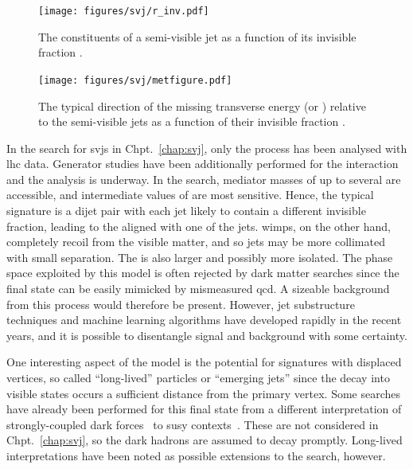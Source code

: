 \begin{figure}[htbp]
    \centering
    \texttt{[image: figures/svj/r\_inv.pdf]}
    \caption[The constituents of a semi-visible jet as a function of its invisible fraction]{The constituents of a semi-visible jet as a function of its invisible fraction \rinv \cite{Cohen:2017pzm}.}
    \label{fig:theory_svj_rinv}
\end{figure}
    
\begin{figure}[htbp]
    \centering
    \texttt{[image: figures/svj/metfigure.pdf]}
    \caption[The typical direction of the missing transverse energy relative to the semi-visible jets as a function of the invisible fraction \rinv]{The typical direction of the missing transverse energy \ETslash\xspace (or \ptmiss) relative to the semi-visible jets as a function of their invisible fraction \rinv \cite{Cohen:2017pzm}.}
    \label{fig:theory_svj_met_dir}
\end{figure}

In the search for \glspl{svj} in Chpt.~\ref{chap:svj}, only the \schannel process has been analysed with \acrshort{lhc} data. Generator studies have been additionally performed for the \tchannel interaction and the analysis is underway. In the \schannel search, mediator masses of up to several \tTeV are accessible, and intermediate values of \rinv are most sensitive. Hence, the typical signature is a dijet pair with each jet likely to contain a different invisible fraction, leading to the \ptmiss aligned with one of the jets. \glspl{wimp}, on the other hand, completely recoil from the visible matter, and so jets may be more collimated with small separation. The \ptmiss is also larger and possibly more isolated. The phase space exploited by this model is often rejected by dark matter searches since the final state can be easily mimicked by mismeasured \acrshort{qcd}. A sizeable background from this process would therefore be present. However, jet substructure techniques and machine learning algorithms have developed rapidly in the recent years, and it is possible to disentangle signal and background with some certainty.

One interesting aspect of the model is the potential for signatures with displaced vertices, so called ``long-lived'' particles or ``emerging jets'' since the decay into visible states occurs a sufficient distance from the primary vertex. Some searches have already been performed for this final state from a different interpretation of strongly-coupled dark forces~\cite{Sirunyan:2018njd} to \acrlong{susy} contexts~\cite{SUS16038published}. These are not considered in Chpt.~\ref{chap:svj}, so the dark hadrons are assumed to decay promptly. Long-lived interpretations have been noted as possible extensions to the search, however.
